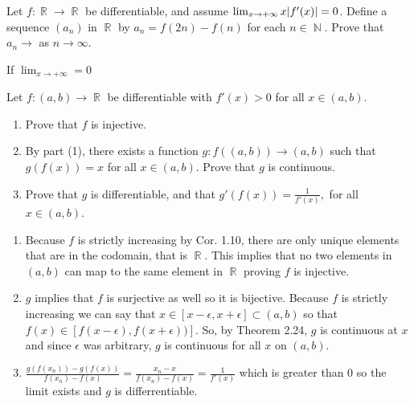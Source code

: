 \documentclass[12pt,letterpaper,boxed]{hmcpset}
\DeclareMathOperator{\N}{\mathbb{N}}
\DeclareMathOperator{\R}{\mathbb{R}}
\DeclarePairedDelimiter\abs{\lvert}{\rvert}%
\begin{document}
\begin{solution}

\end{solution}

\begin{problem}[Exercise 1.11]
Let $f: \R \rightarrow \R$ be differentiable, and assume $\lim_{x \rightarrow +\infty}x\abs{f'(x)}=0$. Define a sequence $(a_n)$ in $\R$ by $a_n = f(2n) -f(n)$ for each $n \in \N$. Prove that $a_n \rightarrow$ as $n\rightarrow\infty$.
\end{problem}

\begin{solution}
If $\lim_{x \rightarrow +\infty} = 0$ 
\end{solution}

\begin{problem}[Exercise 1.12]
Let $f: (a,b) \rightarrow \R$ be differentiable with $f'(x) > 0$ for all $x\in(a,b)$.
\begin{enumerate}
    \item Prove that $f$ is injective.
    \item By part (1), there exists a function $g : f((a,b))\rightarrow (a,b)$ such that $g(f(x))= x$ for all $x\in(a, b).$ Prove that $g$ is continuous.
    \item Prove that $g$ is differentiable, and that $g'(f(x))= \frac{1}{f'(x)},$ for all $x \in (a,b)$.
\end{enumerate}
\end{problem}

\begin{solution}
\begin{enumerate}
    \item Because $f$ is strictly increasing by Cor. 1.10, there are only unique elements that are in the codomain, that is $\R$. This implies that no two elements in $(a,b)$ can map to the same element in $\R$ proving $f$ is injective.
    \item $g$ implies that $f$ is surjective as well so it is bijective. Because $f$ is strictly increasing we can say that $x \in [x - \epsilon, x + \epsilon]\subset (a,b)$ so that $f(x) \in [f(x - \epsilon), f(x + \epsilon))]$. So, by Theorem 2.24, $g$ is continuous at $x$ and since $\epsilon$ was arbitrary, $g$ is continuous for all $x$ on $(a,b)$. 
    \item $\frac{g(f(x_n)) - g(f(x))}{f(x_n) - f(x)} = \frac{x_n - x}{f(x_n) - f(x)} = \frac{1}{f'(x)}$ which is greater than 0 so the limit exists and $g$ is differrentiable. 
\end{enumerate}
\end{solution}
\end{document}
